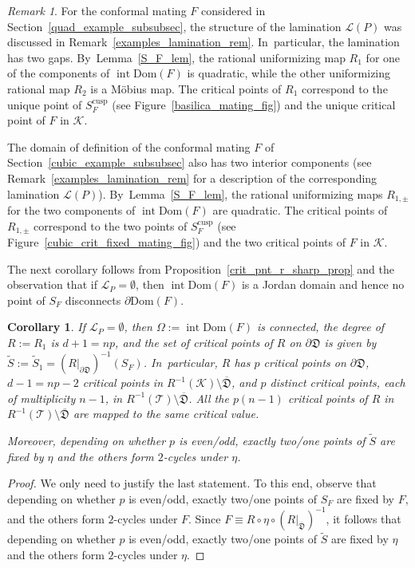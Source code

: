 \documentclass[JEP,XML,SOM,Unicode,NoFloatCountersInSection,published]{cedram}
\newtheorem{corollary}[lemma]{Corollary}
\theoremstyle{definition}
\theoremstyle{remark}
\newtheorem{remark}[lemma]{Remark}
\newcommand{\cT}{\mathcal{T}}
\newcommand{\cK}{\mathcal{K}}
\DeclareMathOperator{\Int}{int}
\begin{document}
\begin{remark}\label{examples_deg_crit_pnt_rem}
For the conformal mating $F$ considered in Section~\ref{quad_example_subsubsec}, the structure of the lamination $\mathcal{L}(P)$ was discussed in Remark~\ref{examples_lamination_rem}. In~particular, the lamination has two gaps. By~Lemma~\ref{S_F_lem}, the rational uniformizing map $R_1$ for one of the components of $\Int{\mathrm{Dom}(F)}$ is quadratic, while the other uniformizing rational map $R_2$ is a Möbius map. The critical points of $R_1$ correspond to the unique point of $S_F^{\mathrm{cusp}}$ (see Figure~\ref{basilica_mating_fig}) and the unique critical point of $F$ in $\cK$.

The domain of definition of the conformal mating $F$ of Section~\ref{cubic_example_subsubsec} also has two interior components (see Remark~\ref{examples_lamination_rem} for a description of the corresponding lamination $\mathcal{L}(P)$). By~Lemma~\ref{S_F_lem}, the rational uniformizing maps $R_{1,\pm}$ for the two components of $\Int{\mathrm{Dom}(F)}$ are quadratic. The critical points of $R_{1,\pm}$ correspond to the two points of $S_F^{\mathrm{cusp}}$ (see Figure~\ref{cubic_crit_fixed_mating_fig}) and the two critical points of $F$ in $\cK$.
\end{remark}

The next corollary follows from Proposition~\ref{crit_pnt_r_sharp_prop} and the observation that if $\mathcal{L}_P=\emptyset$, then $\Int{\mathrm{Dom}(F)}$ is a Jordan domain and hence no point of $S_F$ disconnects $\partial\mathrm{Dom}(F)$.

\begin{corollary}\label{crit_pnt_r_cor}
If $\mathcal{L}_P=\emptyset$, then $\Omega:=\Int{\mathrm{Dom}(F)}$ is connected, the degree of $R:=R_1$ is $d+1=np$, and the set of critical points of $R$ on $\partial\mathfrak{D}$ is given by $\widetilde{S}:=\widetilde{S}_1=(R\vert_{\partial\mathfrak{D}})^{-1}(S_F)$. In~particular, $R$ has $p$ critical points on $\partial\mathfrak{D}$, $d-1=np-2$ critical points in $R^{-1}(\mathcal{K})\setminus\overline{\mathfrak{D}}$, and $p$ distinct critical points, each of multiplicity $n-1$, in $R^{-1}(\cT)\setminus\overline{\mathfrak{D}}$. All the $p(n-1)$ critical points of $R$ in $R^{-1}(\cT)\setminus\overline{\mathfrak{D}}$ are mapped to the same critical value.

Moreover, depending on whether $p$ is even/odd, exactly two/one points of $\widetilde{S}$ are fixed by $\eta$ and the others form $2$-cycles under $\eta$.
\end{corollary}
\begin{proof}
We only need to justify the last statement. To this end, observe that depending on whether $p$ is even/odd, exactly two/one points of $S_F$ are fixed by $F$, and the others form $2$-cycles under $F$. Since $F\equiv R\circ\eta\circ (R\vert_{\overline{\mathfrak{D}}})^{-1}$, it follows that depending on whether $p$ is even/odd, exactly two/one points of $\widetilde{S}$ are fixed by $\eta$ and the others form $2$-cycles under $\eta$.
\end{proof}
\end{document}
